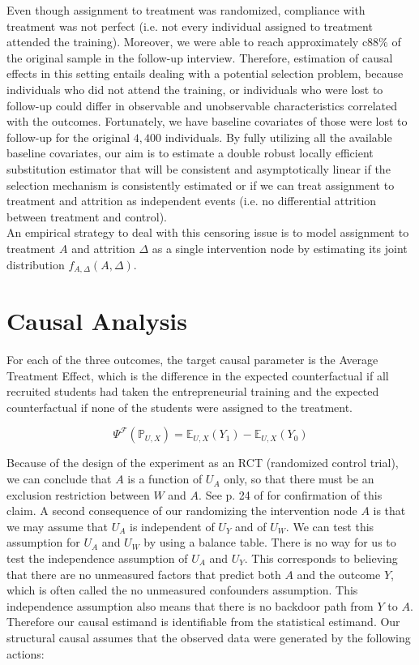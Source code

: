 \documentclass[oneside, notitlepage]{book}
\begin{document}
Even though assignment to treatment was randomized, compliance with treatment was not perfect (i.e. not every individual assigned to treatment attended the training). Moreover, we were able to reach approximately c$88\%$ of the original sample in the follow-up interview. Therefore, estimation of causal effects in this setting entails dealing with a potential selection problem, because individuals who did not attend the training, or individuals who were lost to follow-up could differ in observable and unobservable characteristics correlated with the outcomes. Fortunately, we have baseline covariates of those were lost to follow-up for the original $4,400$ individuals. By fully utilizing all the available baseline covariates, our aim is to estimate a double robust locally efficient substitution estimator that will be consistent and asymptotically linear if the selection mechanism is consistently estimated or if we can treat assignment to treatment and attrition as independent events (i.e. no differential attrition between treatment and control).\\

An empirical strategy to deal with this censoring issue is to model assignment to treatment $A$ and attrition $\Delta$ as a single intervention node by estimating its joint distribution $f_{A,\Delta}(A,\Delta)$.


\section{Causal Analysis}
\label{sec:caus-analys-exper}

For each of the three outcomes, the target causal parameter is the Average Treatment Effect, which is the difference in the expected counterfactual if all recruited students had taken the entrepreneurial training and the expected counterfactual if none of the students were assigned to the treatment.

\[ \Psi^{\mathcal{F}}(\mathbb{P}_{U,X}) = \mathbb{E}_{U,X}(Y_1) - \mathbb{E}_{U,X}(Y_0)  \]

Because of the design of the experiment as an RCT (randomized control trial), we can conclude that $A$ is a function of $U_A$ only, so that there must be an exclusion restriction between $W$ and $A$. See p. 24 of \cite{tlb} for confirmation of this claim. A second consequence of our randomizing the intervention node $A$ is that we may assume that $U_A$ is independent of $U_Y$ and of $U_W$. We can test this assumption for $U_A$ and $U_W$ by using a balance table. There is no way for us to test the independence assumption of $U_A$ and $U_Y$. This corresponds to believing that there are no unmeasured factors that predict both $A$ and the outcome $Y$, which is often called the no unmeasured confounders assumption. This independence assumption also means that there is no backdoor path from $Y$ to $A$. Therefore our causal estimand is identifiable from the statistical estimand. Our structural causal assumes that the observed data were generated by the following actions: \\
\end{document}
